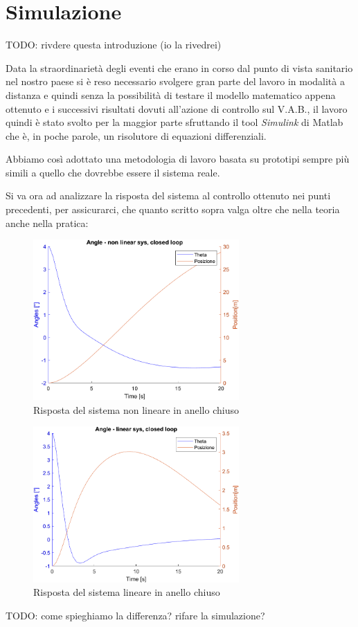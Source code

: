 \section{Simulazione}

TODO: rivdere questa introduzione (io la rivedrei)

Data la straordinarietà degli eventi che erano in corso dal punto di vista sanitario nel nostro paese si è reso necessario svolgere gran parte del lavoro in modalità a distanza e quindi senza la possibilità di testare il modello matematico appena ottenuto e i successivi risultati dovuti all'azione di controllo sul V.A.B., il lavoro quindi è stato svolto per la maggior parte sfruttando il tool \textit{Simulink} di Matlab che è, in poche parole, un risolutore di equazioni differenziali.

Abbiamo così adottato una metodologia di lavoro basata su prototipi sempre più simili a quello che dovrebbe essere il sistema reale.

Si va ora ad analizzare la risposta del sistema al controllo ottenuto nei punti precedenti, per assicurarci, che quanto scritto sopra valga oltre che nella teoria anche nella pratica:
\begin{figure}[H]
	\centering   	
	\includegraphics[width=0.7\textwidth]{Immagini/closed_loop_non_linear.png}
	\caption{Risposta del sistema non lineare in anello chiuso}
	\label{fig:closed_loop_non_linear_response}
\end{figure}
\begin{figure}[H]
	\centering   	
	\includegraphics[width=0.7\textwidth]{Immagini/closed_loop_linear.png}
	\caption{Risposta del sistema lineare in anello chiuso}
	\label{fig:closed_loop_linear_response}
\end{figure}
TODO: come spieghiamo la differenza? rifare la simulazione?



